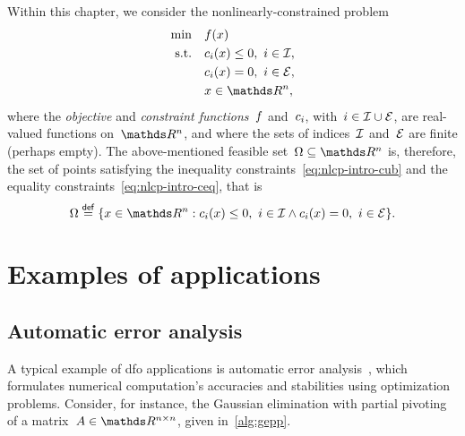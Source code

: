 Within this chapter, we consider the nonlinearly-constrained problem
\begin{subequations}
    \label{eq:nlcp-intro}
    \begin{align}
        \min        & \quad \obj(x)\\
        \text{s.t.} & \quad \con{i}(x) \le 0, ~ i \in \iub, \label{eq:nlcp-intro-cub}\\
                    & \quad \con{i}(x) = 0, ~ i \in \ieq, \label{eq:nlcp-intro-ceq}\\
                    & \quad x \in \R^n, \nonumber
    \end{align}
\end{subequations}
where the \emph{objective} and \emph{constraint functions}~$f$ and~$c_{i}$, with~$i \in \mathcal{I} \cup \mathcal{E}$, are real-valued functions on~$\R^n$, and where the sets of indices~$\mathcal{I}$ and~$\mathcal{E}$ are finite (perhaps empty).
The above-mentioned feasible set~$\Omega \subseteq \R^n$ is, therefore, the set of points satisfying the inequality constraints~\cref{eq:nlcp-intro-cub} and the equality constraints~\cref{eq:nlcp-intro-ceq}, that is
\begin{equation*}
    \Omega \eqdef \set{x \in \R^n : \con{i}(x) \le 0, ~ i \in \iub \land \con{i}(x) = 0, ~ i \in \ieq}.
\end{equation*}

\section{Examples of  applications}

\subsection{Automatic error analysis}

A typical example of \gls{dfo} applications is automatic error analysis~\cite{Higham_1993,Higham_2002}, which formulates numerical computation's accuracies and stabilities using optimization problems.
Consider, for instance, the Gaussian elimination with partial pivoting of a matrix~$A \in \R^{n \times n}$, given in~\cref{alg:gepp}.

